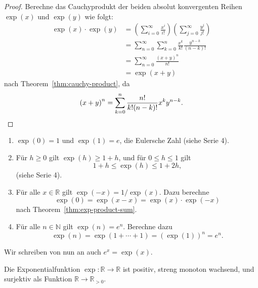 \documentclass[../main.tex]{subfiles}
\begin{document}
\begin{proof}
  Berechne das Cauchyprodukt
  der beiden absolut konvergenten Reihen
  $\exp(x)$ und $\exp(y)$ wie folgt:
  \begin{align*}
    \exp(x) \cdot \exp(y) & =
    \left(\sum_{i=0}^{\infty} \frac{x^i}{i!}\right)
    \left( \sum_{j=0}^{\infty} \frac{y^j}{j!} \right)\\ &
    = \sum_{n=0}^{\infty} \sum_{k=0}^{n} \frac{x^k}{k!} 
    \frac{y^{n-k}}{(n-k)!} \\ &
    = \sum_{n=0}^{\infty} \frac{{(x + y)}^n}{n!} \\&
    = \exp(x + y)
  \end{align*}
  nach Theorem~\ref{thm:cauchy-product},
  da
  \[
    {(x + y)}^n = \sum_{k=0}^{n} \frac{n!}{k! {(n-k)}!} x^k y^{n-k}.
    \qedhere
  \]
\end{proof}

\begin{eig-exp}
  \leavevmode
  \begin{enumerate}[\normalfont(i)]
    \item $\exp(0) = 1$ und $\exp(1) = e$, die Eulersche Zahl
      (siehe Serie 4).
    \item Für $h \geq 0$ gilt $\exp(h) \geq 1 + h$,
      und für $0 \leq h \leq 1$ gilt  
      \[
        1 + h \leq \exp(h) \leq 1 + 2h,
      \]
      (siehe Serie 4). %
    \item Für alle $x \in \mathbb{R}$ gilt
      \(
        \exp(-x) = {1}/{\exp(x)}.
      \)
      Dazu berechne
      \[
        \exp(0) = \exp(x - x) = \exp(x) \cdot \exp(-x)
      \]
      nach Theorem~\ref{thm:exp-product-sum}.
    \item Für alle
      $n \in \mathbb{N}$ gilt $\exp(n) = e^n$. Berechne dazu
      \[
        \exp(n) = \exp(1 + \cdots + 1) =
        {\left( \exp(1) \right)}^n = e^n.
      \]
  \end{enumerate}
\end{eig-exp}

\begin{notation}
  Wir schreiben von nun an auch
  \(
    e^x = \exp(x).
  \)
\end{notation}

\begin{proposition*}
  Die Exponentialfunktion $\exp \colon \mathbb{R} \to \mathbb{R}$ 
  ist positiv, streng monoton wachsend, und surjektiv
  als Funktion $\mathbb{R} \to \mathbb{R}_{>0}$.
\end{proposition*}
\end{document}
